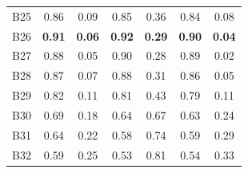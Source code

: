 \documentclass{article}
\theoremstyle{plain}
\theoremstyle{definition}
\theoremstyle{remark}
\begin{document}
\begin{table}[h!]
{\begin{tabular}{lcccccc}
      B25                             &
      0.86                            &
      0.09                            &
      0.85                            &
      0.36                            &
      0.84                            &
      0.08                              \\

      B26                             &
      \textbf{0.91}                   &
      \textbf{0.06}                   &
      \textbf{0.92}                   &
      \textbf{0.29}                   &
      \textbf{0.90}                   &
      \textbf{0.04}                     \\

      B27                             &
      0.88                            &
      0.05                            &
      0.90                            &
      0.28                            &
      0.89                            &
      0.02                              \\

      B28                             &
      0.87                            &
      0.07                            &
      0.88                            &
      0.31                            &
      0.86                            &
      0.05                              \\

      B29                             &
      0.82                            &
      0.11                            &
      0.81                            &
      0.43                            &
      0.79                            &
      0.11                              \\

      B30                             &
      0.69                            &
      0.18                            &
      0.64                            &
      0.67                            &
      0.63                            &
      0.24                              \\

      B31                             &
      0.64                            &
      0.22                            &
      0.58                            &
      0.74                            &
      0.59                            &
      0.29                              \\

      B32                             &
      0.59                            &
      0.25                            &
      0.53                            &
      0.81                            &
      0.54                            &
      0.33                              \\


\end{tabular}}
\end{table}
\end{document}
